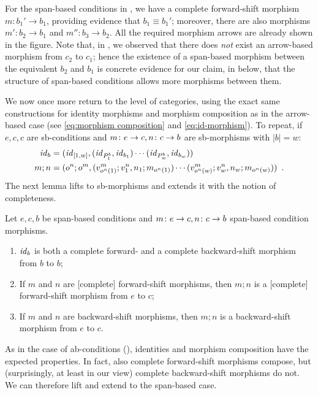 %
\begin{example}
For the span-based conditions in , we have a complete forward-shift morphism $m:b_1'\to b_1$, providing evidence that $b_1\equiv b_1'$; moreover, there are also morphisms $m':b_2\to b_1$ and $m'':b_3\to b_2$. All the required morphism arrows are already shown in the figure. Note that, in , we observed that there does \emph{not} exist an arrow-based morphism from $c_2$ to $c_1$; hence the existence of a span-based morphism between the equivalent $b_2$ and $b_1$ is concrete evidence for our claim, in  below, that the structure of span-based conditions allows more morphisms between them.
\end{example}
%
We now once more return to the level of categories, using the exact same constructions for identity morphisms and morphism composition as in the arrow-based case (see \eqref{eq:morphism composition} and \eqref{eq:id-morphism}).
\iffull
To repeat, if $e,c,c$ are sb-conditions and $m\colon e\rightarrow c,n\colon c\rightarrow b$ are sb-morphisms with $|b|=w$:
%
\begin{align*}
\mathit{id}_b & = (\mathit{id}_{[1,w]},(\mathit{id}_{P^b_1},\mathit{id}_{b_1})\cdots
                       (\mathit{id}_{P^b_w},\mathit{id}_{b_w})) \\
m;n & =
   (o^n;o^m,(v^m_{o^n(1)};v^n_1,n_1;m_{o^n(1)})\cdots 
              (v^m_{o^n(w)};v^n_w,n_w;m_{o^n(w)}))
\enspace.
\end{align*}
%
The next lemma lifts  to sb-morphisms and extends it with the notion of completeness.

\begin{lemma}
Let $e,c,b$ be span-based conditions and $m\colon e\rightarrow c,n\colon c\rightarrow b$ span-based condition morphisms.
\begin{enumerate}[topsep=\smallskipamount]
\item $\mathit{id}_b$ is both a complete forward- and a complete backward-shift morphism from $b$ to $b$;
\item If $m$ and $n$ are [complete] forward-shift morphisms, then $m;n$ is a [complete] forward-shift morphism from $e$ to $c$;
\item If $m$ and $n$ are backward-shift morphisms, then $m;n$ is a backward-shift morphism from $e$ to $c$.
\end{enumerate}
\end{lemma}
\else
As in the case of ab-conditions (), identities and morphism composition have the expected properties. In fact, also complete forward-shift morphisms compose, but (surprisingly, at least in our view) complete backward-shift morphisms do not.
\fi
We can therefore lift and extend  to the span-based case.

